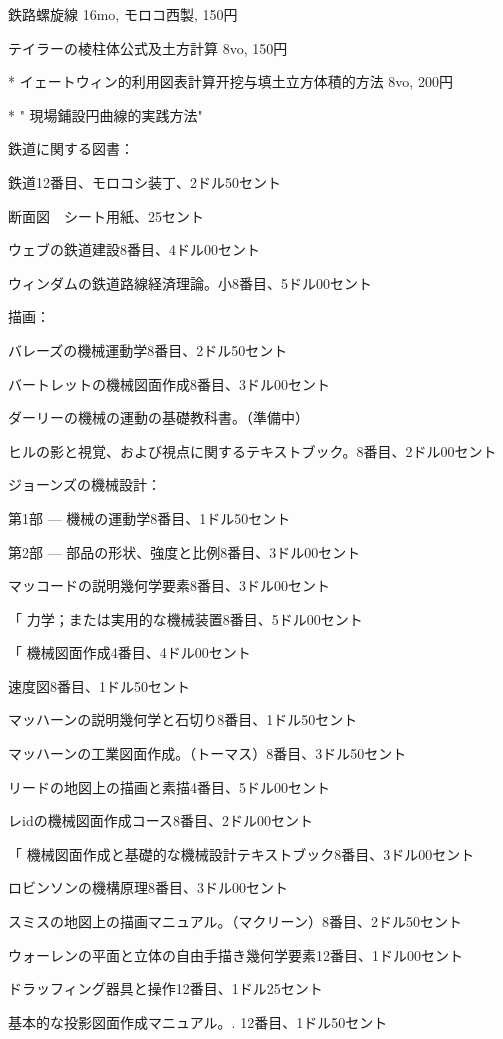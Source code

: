 \documentclass[a4paper,11pt,openany]{ltjsbook}
\begin{document}
鉄路螺旋線 16mo, モロコ西製, 150円

テイラーの棱柱体公式及土方計算 8vo, 150円

* イェートウィン的利用図表計算开挖与填土立方体積的方法 8vo, 200円

* " 現場鋪設円曲線的実践方法"

鉄道に関する図書：

鉄道12番目、モロコシ装丁、2ドル50セント

断面図　シート用紙、25セント

ウェブの鉄道建設8番目、4ドル00セント

ウィンダムの鉄道路線経済理論。小8番目、5ドル00セント

描画：

バレーズの機械運動学8番目、2ドル50セント

バートレットの機械図面作成8番目、3ドル00セント

ダーリーの機械の運動の基礎教科書。（準備中）

ヒルの影と視覚、および視点に関するテキストブック。8番目、2ドル00セント

ジョーンズの機械設計：

第1部 — 機械の運動学8番目、1ドル50セント

第2部 — 部品の形状、強度と比例8番目、3ドル00セント

マッコードの説明幾何学要素8番目、3ドル00セント

「          力学；または実用的な機械装置8番目、5ドル00セント

「          機械図面作成4番目、4ドル00セント

速度図8番目、1ドル50セント

マッハーンの説明幾何学と石切り8番目、1ドル50セント

マッハーンの工業図面作成。（トーマス）8番目、3ドル50セント

リードの地図上の描画と素描4番目、5ドル00セント

レidの機械図面作成コース8番目、2ドル00セント

「      機械図面作成と基礎的な機械設計テキストブック8番目、3ドル00セント

ロビンソンの機構原理8番目、3ドル00セント

スミスの地図上の描画マニュアル。（マクリーン）8番目、2ドル50セント

ウォーレンの平面と立体の自由手描き幾何学要素12番目、1ドル00セント

ドラッフィング器具と操作12番目、1ドル25セント

基本的な投影図面作成マニュアル。. 12番目、1ドル50セント
\end{document}
